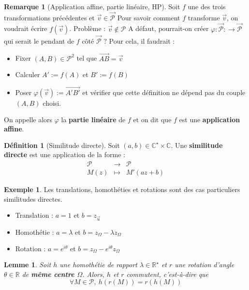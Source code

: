 \documentclass[french]{book}
\newcommand{\R}{\mathbb{R}}
\newcommand{\C}{\mathbb{C}}
\newcommand{\st}{^\star}
\theoremstyle{plain}
\newtheorem{lem}{Lemme}[chapter]
\theoremstyle{definition}
\newtheorem{dfn}{Définition}[chapter]
\newtheorem{exa}{Exemple}[chapter]
\newtheorem{rmq}{Remarque}[chapter]
\theoremstyle{remark}
\begin{document}
\begin{rmq}[Application affine, partie linéaire, HP]
	Soit $f$ une des trois transformations précédentes et $\overrightarrow{v}\in\overrightarrow{\mathcal{P}}$ Pour savoir comment $f$ transforme $\overrightarrow{v}$, on voudrait écrire $f(\overrightarrow{v})$. Problème : $\overrightarrow{v}\notin\mathcal{P}$ A défaut, pourrait-on créer $\varphi :\overrightarrow{\mathcal{P}}:\rightarrow\overrightarrow{\mathcal{P}}$ qui serait le pendant de $f$ côté $\overrightarrow{\mathcal{P}}$ ? Pour cela, il faudrait : \begin{itemize}
		\item Fixer $(A,B)\in\mathcal{P}^2$ tel que $\overrightarrow{AB}=\overrightarrow{v}$
		\item Calculer $A':=f(A)$ et $B':=f(B)$
		\item Poser $\varphi(\overrightarrow{v}):=\overrightarrow{A'B'}$ et vérifier que cette définition ne dépend pas du couple $(A,B)$ choisi.
	\end{itemize}
	On appelle alors $\varphi$ la \textbf{partie linéaire} de $f$ et on dit que $f$ est une \textbf{application affine}.
\end{rmq}
\begin{dfn}[Similitude directe]
	Soit $(a,b)\in\C\st\times\C$. Une \textbf{similitude directe} est une application de la forme : $$\begin{array}{ccc}\mathcal{P}&\rightarrow&\mathcal{P}\\ M(z)&\mapsto&M'(az+b)\end{array}$$
\end{dfn}
\begin{exa}
	Les translations, homothéties et rotations sont des cas particuliers similitudes directes.
	\begin{itemize}
		\item Translation : $a=1$ et $b=z_{\overrightarrow{u}}$
		\item Homothétie : $a=\lambda$ et $b=z_{\Omega}-\lambda z_{\Omega}$
		\item Rotation : $a=e^{i\theta}$ et $b=z_{\Omega}-e^{i\theta}z_{\Omega}$
	\end{itemize}
\end{exa}
\begin{lem}
	Soit $h$ une homothétie de rapport $\lambda\in\R\st$ et $r$ une rotation d'angle $\theta\in\R$ de \textbf{même centre $\Omega$}. Alors, $h$ et $r$ commutent, c'est-à-dire que $$\forall M\in\mathcal{P},\ h(r(M))=r(h(M))$$
\end{lem}
\end{document}

